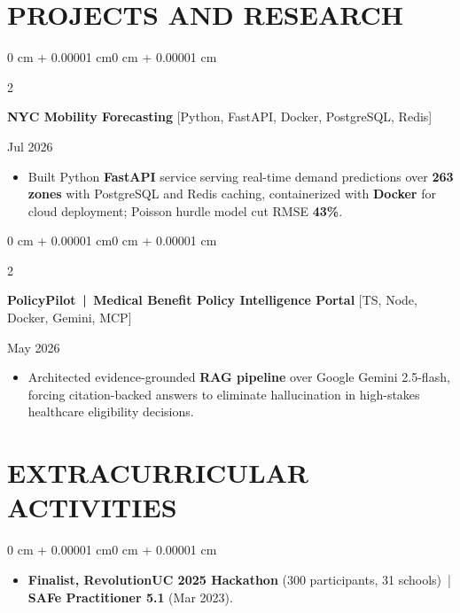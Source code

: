 \documentclass[10pt, letterpaper]{article}
\newenvironment{highlights}{
    \begin{itemize}[
        topsep=0.10 cm,
        parsep=0.06 cm,
        partopsep=0pt,
        itemsep=0.06 cm,
        leftmargin=12pt
    ]
}{
    \end{itemize}
}
\newenvironment{onecolentry}{
    \begin{adjustwidth}{0 cm + 0.00001 cm}{0 cm + 0.00001 cm}
}{
    \end{adjustwidth}
}
\newenvironment{twocolentry}[2][]{
    \onecolentry
    \def\secondColumn{#2}
    \setcolumnwidth{\fill, 4.5 cm}
    \begin{paracol}{2}
}{
    \switchcolumn \raggedleft \secondColumn
    \end{paracol}
    \endonecolentry
}
\begin{document}
\vspace{0.15 cm}

\section{PROJECTS AND RESEARCH}
\begin{twocolentry}{Jul 2026}
\textbf{NYC Mobility Forecasting} [Python, FastAPI, Docker, PostgreSQL, Redis]
\end{twocolentry}
\begin{highlights}
  \item Built Python \textbf{FastAPI} service serving real-time demand predictions over \textbf{263 zones} with PostgreSQL and Redis caching, containerized with \textbf{Docker} for cloud deployment; Poisson hurdle model cut RMSE \textbf{43\%}.
\end{highlights}

\vspace{0.12 cm}

\begin{twocolentry}{May 2026}
\textbf{PolicyPilot \,|\, Medical Benefit Policy Intelligence Portal} [TS, Node, Docker, Gemini, MCP]
\end{twocolentry}
\begin{highlights}
  \item Architected evidence-grounded \textbf{RAG pipeline} over Google Gemini 2.5-flash, forcing citation-backed answers to eliminate hallucination in high-stakes healthcare eligibility decisions.
\end{highlights}

\section{EXTRACURRICULAR ACTIVITIES}
\begin{onecolentry}
\begin{highlights}
  \item \textbf{Finalist, RevolutionUC 2025 Hackathon} (300 participants, 31 schools) \,|\, \textbf{SAFe Practitioner 5.1} (Mar 2023).
\end{highlights}
\end{onecolentry}
\end{document}
